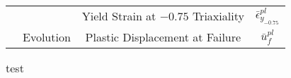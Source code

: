 \begin{table}[]
\begin{tabular}{@{}cccc@{}}
                         &                                                                                       & Yield Strain at $-0.75$ Triaxiality        & $\bar{\epsilon}^{pl}_{y_{-0.75}}$ \\ \cmidrule{2-2}
                         & Evolution                                                                             & Plastic Displacement at Failure            & $\bar{u}^{pl}_f$                  \\ \bottomrule
\end{tabular}
\end{table}

\begin{table}[]
\caption{test}
\label{tab:1}
\begin{tabular}{@{}lll@{}}
\end{tabular}
\end{table}
